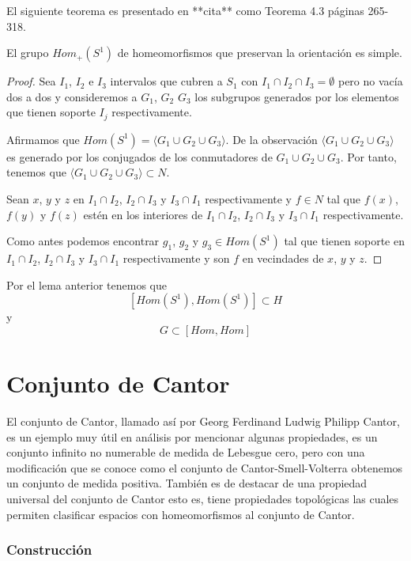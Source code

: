El siguiente teorema es presentado en **cita** como  Teorema 4.3 páginas 265-318.

\begin{te}
El grupo $Hom_+(S^1)$ de homeomorfismos que preservan la orientación es simple.
\end{te}
\begin{proof}
Sea $I_1$, $I_2$ e $I_3$ intervalos que cubren a $S_1$ con  $I_1 \cap I_2 \cap I_3=\emptyset$ pero no vacía dos a dos y consideremos a  $G_1$, $G_2$ $G_3$ los subgrupos generados por los elementos que tienen soporte $I_j$ respectivamente.
	
		
Afirmamos que $Hom(S^1)=\langle G_1 \cup G_2 \cup G_3 \rangle.$ De la observación $\langle G_1 \cup G_2 \cup G_3 \rangle$ es generado por los conjugados de los conmutadores de $G_1\cup G_2 \cup G_3$. Por tanto, tenemos que $\langle G_1 \cup G_2 \cup G_3 \rangle \subset N$.

Sean $x$, $y$ y $z$ en $I_1 \cap I_2$, $I_2 \cap I_3$ y $I_3 \cap I_1$ respectivamente y $f \in N$ tal que $f(x)$, $f(y)$ y $f(z)$ estén en los interiores de  $I_1 \cap I_2$, $I_2 \cap I_3$ y $I_3 \cap I_1$ respectivamente. 

Como antes podemos encontrar $g_1$, $g_2$ y $g_3 \in Hom(S^1)$ tal que tienen soporte en  $I_1 \cap I_2$, $I_2 \cap I_3$ y $I_3 \cap I_1$ respectivamente y son $f$ en vecindades de $x$, $y$ y $z.$
\end{proof} 
 Por el lema anterior tenemos que $$[Hom(S^1),Hom(S^1)] \subset H$$ y $$G \subset [Hom,Hom]$$

\section{Conjunto de Cantor}

El conjunto de Cantor, llamado así por Georg Ferdinand Ludwig Philipp Cantor, es un ejemplo muy útil en análisis por mencionar algunas propiedades, es un conjunto infinito no numerable de medida de Lebesgue cero, pero con una modificación que se conoce como el conjunto de Cantor-Smell-Volterra obtenemos un conjunto de medida positiva. También es de destacar de una propiedad universal del conjunto de Cantor esto es, tiene propiedades topológicas las cuales permiten clasificar espacios con homeomorfismos al conjunto de Cantor. 


\subsubsection{Construcción}

